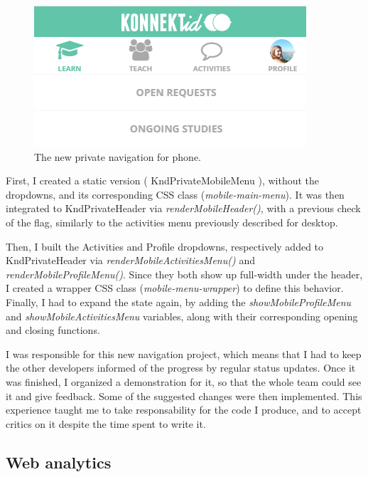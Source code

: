 \begin{figure}[H]
    \centering
    \includegraphics{figure/newNavPhone.png}
    \caption{The new private navigation for phone.}
    \label{fig:newNavPhone}
\end{figure}

First, I created a static version (\guillemotleft{} KndPrivateMobileMenu \guillemotright{}), without the dropdowns, and its corresponding CSS class (\textit{mobile-main-menu}). It was then integrated to \guillemotleft{} KndPrivateHeader \guillemotright{} via \textit{renderMobileHeader()}, with a previous check of the flag, similarly to the activities menu previously described for desktop.

Then, I built the \guillemotleft{} Activities \guillemotright{} and \guillemotleft{} Profile \guillemotright{} dropdowns, respectively added to \guillemotleft{} KndPrivateHeader \guillemotright{} via \textit{renderMobileActivitiesMenu()} and \textit{renderMobileProfileMenu()}. Since they both show up full-width under the header, I created a wrapper CSS class (\textit{mobile-menu-wrapper}) to define this behavior. Finally, I had to expand the state again, by adding the \textit{showMobileProfileMenu} and \textit{showMobileActivitiesMenu} variables, along with their corresponding opening and closing functions.

I was responsible for this new navigation project, which means that I had to keep the other developers informed of the progress by regular status updates. Once it was finished, I organized a demonstration for it, so that the whole team could see it and give feedback. Some of the suggested changes were then implemented. This experience taught me to take responsability for the code I produce, and to accept critics on it despite the time spent to write it.

\subsection{Web analytics}
\label{ssec:analytics}

